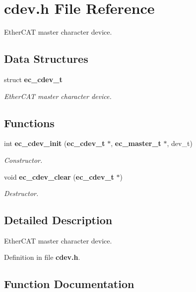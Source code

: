 \section{cdev.\-h \-File \-Reference}
\label{cdev_8h}


\-Ether\-C\-A\-T master character device.  


\subsection*{\-Data \-Structures}
\begin{DoxyCompactItemize}
\item 
struct {\bf ec\-\_\-cdev\-\_\-t}
\begin{DoxyCompactList}\small\item\em \-Ether\-C\-A\-T master character device. \end{DoxyCompactList}\end{DoxyCompactItemize}
\subsection*{\-Functions}
\begin{DoxyCompactItemize}
\item 
int {\bf ec\-\_\-cdev\-\_\-init} ({\bf ec\-\_\-cdev\-\_\-t} $\ast$, {\bf ec\-\_\-master\-\_\-t} $\ast$, dev\-\_\-t)
\begin{DoxyCompactList}\small\item\em \-Constructor. \end{DoxyCompactList}\item 
void {\bf ec\-\_\-cdev\-\_\-clear} ({\bf ec\-\_\-cdev\-\_\-t} $\ast$)\label{cdev_8h_a2f7ae759bd3e5d289477cc5d3f0194ff}

\begin{DoxyCompactList}\small\item\em \-Destructor. \end{DoxyCompactList}\end{DoxyCompactItemize}


\subsection{\-Detailed \-Description}
\-Ether\-C\-A\-T master character device. 

\-Definition in file {\bf cdev.\-h}.



\subsection{\-Function \-Documentation}
